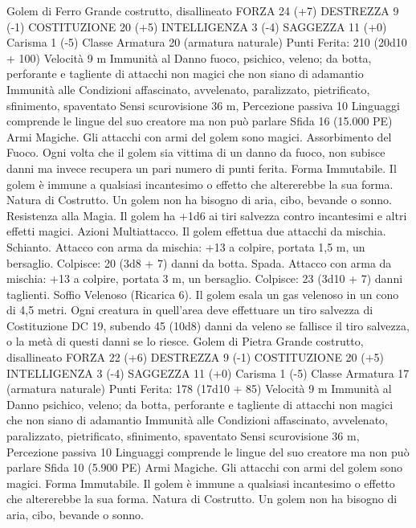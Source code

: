 \begin{multicols}{2}
Golem di Ferro
Grande costrutto, disallineato
FORZA 24 (+7)
DESTREZZA 9 (-1)
COSTITUZIONE 20 (+5)
INTELLIGENZA 3 (-4)
SAGGEZZA 11 (+0)
Carisma 1 (-5)
Classe Armatura 20 (armatura naturale)
\hspace*{0pt}\hfill{Punti Ferita}: 210 (20d10 + 100)
Velocità 9 m
Immunità al Danno fuoco, psichico, veleno; da botta,
perforante e tagliente di attacchi non magici che non siano di
adamantio
Immunità alle Condizioni affascinato, avvelenato, paralizzato,
pietrificato, sfinimento, spaventato
Sensi scurovisione 36 m, Percezione passiva 10
Linguaggi comprende le lingue del suo creatore ma non può
parlare
Sfida 16 (15.000 PE)
Armi Magiche. Gli attacchi con armi del golem sono magici.
Assorbimento del Fuoco. Ogni volta che il golem sia vittima di
un danno da fuoco, non subisce danni ma invece recupera un pari
numero di punti ferita.
Forma Immutabile. Il golem è immune a qualsiasi incantesimo o
effetto che altererebbe la sua forma.
Natura di Costrutto. Un golem non ha bisogno di aria, cibo,
bevande o sonno.
Resistenza alla Magia. Il golem ha +1d6 ai tiri salvezza
contro incantesimi e altri effetti magici.
Azioni
Multiattacco. Il golem effettua due attacchi da mischia.
Schianto. Attacco con arma da mischia: +13 a colpire, portata
1,5 m, un bersaglio.
Colpisce: 20 (3d8 + 7) danni da botta.
Spada. Attacco con arma da mischia: +13 a colpire, portata 3 m,
un bersaglio.
Colpisce: 23 (3d10 + 7) danni taglienti.
Soffio Velenoso (Ricarica 6). Il golem esala un gas velenoso in
un cono di 4,5 metri. Ogni creatura in quell’area deve effettuare
un tiro salvezza di Costituzione DC 19, subendo 45 (10d8) danni
da veleno se fallisce il tiro salvezza, o la metà di questi danni se
lo riesce.
Golem di Pietra
Grande costrutto, disallineato
FORZA 22 (+6)
DESTREZZA 9 (-1)
COSTITUZIONE 20 (+5)
INTELLIGENZA 3 (-4)
SAGGEZZA 11 (+0)
Carisma 1 (-5)
Classe Armatura 17 (armatura naturale)
\hspace*{0pt}\hfill{Punti Ferita}: 178 (17d10 + 85)
Velocità 9 m
Immunità al Danno psichico, veleno; da botta, perforante e
tagliente di attacchi non magici che non siano di adamantio
Immunità alle Condizioni affascinato, avvelenato, paralizzato,
pietrificato, sfinimento, spaventato
Sensi scurovisione 36 m, Percezione passiva 10
Linguaggi comprende le lingue del suo creatore ma non può
parlare
Sfida 10 (5.900 PE)
Armi Magiche. Gli attacchi con armi del golem sono magici.
Forma Immutabile. Il golem è immune a qualsiasi incantesimo o
effetto che altererebbe la sua forma.
Natura di Costrutto. Un golem non ha bisogno di aria, cibo,
bevande o sonno.

\end{multicols}
